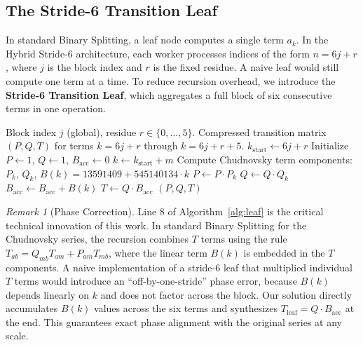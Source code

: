 \documentclass[12pt,a4paper]{article}
\theoremstyle{plain}
\theoremstyle{definition}
\theoremstyle{remark}
\newtheorem{remark}[theorem]{Remark}
\begin{document}
\subsection{The Stride-6 Transition Leaf}
In standard Binary Splitting, a leaf node computes a single term \(a_k\). In the Hybrid Stride-6 architecture, each worker processes indices of the form \(n = 6j + r\), where \(j\) is the block index and \(r\) is the fixed residue. A naive leaf would still compute one term at a time. To reduce recursion overhead, we introduce the \textbf{Stride-6 Transition Leaf}, which aggregates a full block of six consecutive terms in one operation.

\begin{algorithm}[H]
\caption{Stride-6 Transition Leaf (for a single residue \(r\))}
\label{alg:leaf}
\begin{algorithmic}[1]
\Require Block index \(j\) (global), residue \(r \in \{0,\dots,5\}\).
\Ensure Compressed transition matrix \((P, Q, T)\) for terms \(k = 6j+r\) through \(k = 6j+r+5\).
\State \(k_{\text{start}} \gets 6j + r\)
\State Initialize \(P \gets 1\), \(Q \gets 1\), \(B_{\text{acc}} \gets 0\)
    \State \(k \gets k_{\text{start}} + m\)
    \State Compute Chudnovsky term components: \(P_k\), \(Q_k\), \(B(k) = 13591409 + 545140134 \cdot k\)
    \State \(P \gets P \cdot P_k\)
    \State \(Q \gets Q \cdot Q_k\)
    \State \(B_{\text{acc}} \gets B_{\text{acc}} + B(k)\)
\EndFor
\State \(T \gets Q \cdot B_{\text{acc}}\) 
\State \Return \((P, Q, T)\)
\end{algorithmic}
\end{algorithm}

\begin{remark}[Phase Correction]
Line 8 of Algorithm~\ref{alg:leaf} is the critical technical innovation of this work. In standard Binary Splitting for the Chudnovsky series, the recursion combines \(T\) terms using the rule \(T_{ab} = Q_{mb} T_{am} + P_{am} T_{mb}\), where the linear term \(B(k)\) is embedded in the \(T\) components. A naive implementation of a stride-6 leaf that multiplied individual \(T\) terms would introduce an ``off-by-one-stride'' phase error, because \(B(k)\) depends linearly on \(k\) and does not factor across the block. Our solution directly accumulates \(B(k)\) values across the six terms and synthesizes \(T_{\text{leaf}} = Q \cdot B_{\text{acc}}\) at the end. This guarantees exact phase alignment with the original series at any scale.
\end{remark}
\end{document}
